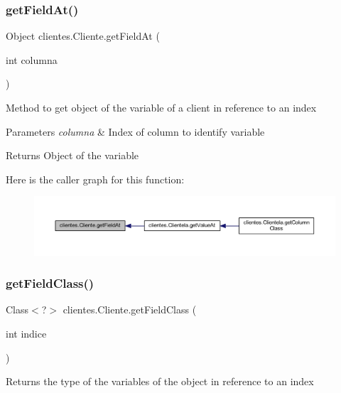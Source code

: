 \subsubsection{\texorpdfstring{get\+Field\+At()}{getFieldAt()}}
{\footnotesize\ttfamily Object clientes.\+Cliente.\+get\+Field\+At (\begin{DoxyParamCaption}\item[{int}]{columna }\end{DoxyParamCaption})}

Method to get object of the variable of a client in reference to an index


\begin{DoxyParams}{Parameters}
{\em columna} & Index of column to identify variable \\
\hline
\end{DoxyParams}
\begin{DoxyReturn}{Returns}
Object of the variable 
\end{DoxyReturn}
Here is the caller graph for this function\+:\nopagebreak
\begin{figure}[H]
\begin{center}
\leavevmode
\includegraphics[width=350pt]{classclientes_1_1_cliente_a7ec404ddfce7ca5c70e85f005988edc3_icgraph}
\end{center}
\end{figure}
\mbox{\label{classclientes_1_1_cliente_a8c76bd0b8a714475bac4a132e481daec}} 
\subsubsection{\texorpdfstring{get\+Field\+Class()}{getFieldClass()}}
{\footnotesize\ttfamily Class$<$?$>$ clientes.\+Cliente.\+get\+Field\+Class (\begin{DoxyParamCaption}\item[{int}]{indice }\end{DoxyParamCaption})}

Returns the type of the variables of the object in reference to an index


